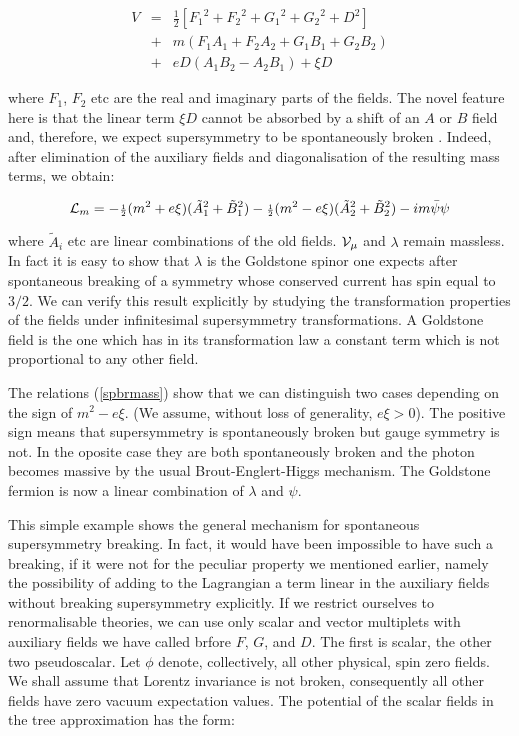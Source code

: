 \documentclass[a4paper,11pt]{article}
\begin{document}
\begin{eqnarray}
\label{qed}
V & = & {\scriptstyle {\frac{1}{2}}}[{F_1}^2 + {F_2}^2 + {G_1}^2 + {G_2}^2 + D^2] \nonumber \\
& + & m(F_1 A_1 +F_2 A_2 + G_1 B_1 + G_2 B_2) \\
& + & e D(A_1 B_2 -A_2 B_1) +\xi D \nonumber 
\end{eqnarray}

\noindent
where $F_1$, $F_2$ etc are the real and imaginary parts of the fields. The novel feature here is that the linear term $\xi D$ cannot be absorbed by a shift of an $A$ or $B$ field and, therefore, we expect supersymmetry to be spontaneously broken \cite{FI}. Indeed, after elimination of the auxiliary fields and diagonalisation of the resulting mass terms, we obtain:


\begin{equation}
\label{spbrmass}
{\cal{L}}_m =- {\scriptstyle {\frac{1}{2}}}(m^2 + e\xi)({{\tilde{A}}_1}^2 + {{\tilde{B}}_1}^2) - {\scriptstyle {\frac{1}{2}}}(m^2 - e\xi)({{\tilde{A}}_2}^2 + {{\tilde{B}}_2}^2) - i m \bar{\psi} \psi
\end{equation}

\noindent
where ${\tilde{A}}_i$ etc are linear combinations of the old fields. ${\cal{V}_{\mu}}$ and $\lambda $ remain massless. In fact it
is easy to show that 
$\lambda$ is the Goldstone spinor one expects after spontaneous
breaking of a symmetry whose conserved current has spin equal to
$3/2$. We can verify this result explicitly by studying the
transformation properties of the fields under infinitesimal
supersymmetry transformations. A Goldstone field is the one which has
in its transformation law a constant term which is not proportional to
any other field. 

The relations (\ref{spbrmass}) show that we can distinguish two cases
depending on the sign of $ m^2 - e\xi $. (We assume, without loss of
generality, $e\xi >0 $). The positive sign means that supersymmetry is
spontaneously broken but gauge symmetry is not. In the oposite case
they are both spontaneously broken and the photon becomes massive by
the usual Brout-Englert-Higgs mechanism. The Goldstone fermion is now
a linear combination of $\lambda$ and $\psi$. 

This simple example shows the general mechanism for spontaneous
supersymmetry breaking. In fact, it would have been impossible to have
such a breaking, if it were not for the peculiar property we mentioned
earlier, namely the possibility of adding to the Lagrangian a term
linear in the auxiliary fields without breaking supersymmetry
explicitly. If we restrict ourselves to renormalisable
theories, we can use only scalar and vector multiplets with auxiliary
fields we have called brfore $F$, $G$, and $D$. The first is scalar,
the other two pseudoscalar. Let $\phi$ denote, collectively, all other
physical, spin zero fields. We shall assume that Lorentz invariance is
not broken, consequently all other fields have zero vacuum expectation
values. The potential of the scalar fields in the tree approximation
has the form:
\end{document}
